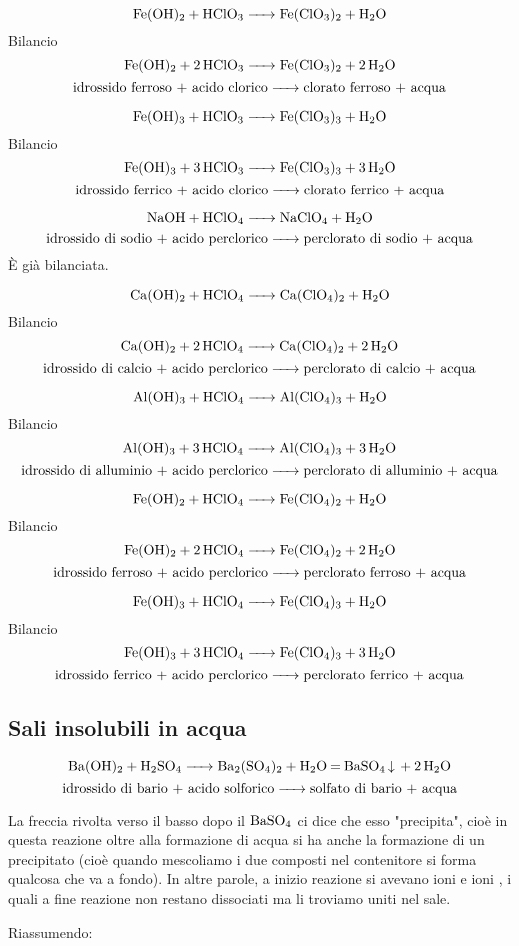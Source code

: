 $$\ce{Fe(OH)_2 + HClO_3 -> Fe(ClO_3)_2 + H_2O}$$Bilancio
$$\ce{Fe(OH)_2 + 2HClO_3 -> Fe(ClO_3)_2 + 2H_2O}$$
$$\text{idrossido ferroso + acido clorico}\ce{->}\text{clorato ferroso + acqua}$$

$$\ce{Fe(OH)_3 + HClO_3 -> Fe(ClO_3)_3 + H_2O}$$Bilancio
$$\ce{Fe(OH)_3 + 3 HClO_3 -> Fe(ClO_3)_3 + 3 H_2O}$$
$$\text{idrossido ferrico + acido clorico}\ce{->}\text{clorato ferrico + acqua}$$

$$\ce{NaOH + HClO_4 -> NaClO_4 + H_2O}$$
$$\text{idrossido di sodio + acido perclorico}\ce{->}\text{perclorato di sodio + acqua}$$
È già bilanciata.

$$\ce{Ca(OH)_2 + HClO_4 -> Ca(ClO_4)_2 + H_2O}$$Bilancio
$$\ce{Ca(OH)_2 + 2 HClO_4 -> Ca(ClO_4)_2 + 2 H_2O}$$
$$\text{idrossido di calcio + acido perclorico}\ce{->}\text{perclorato di calcio + acqua}$$

$$\ce{Al(OH)_3 + HClO_4 -> Al(ClO_4)_3 + H_2O}$$Bilancio
$$\ce{Al(OH)_3 + 3 HClO_4 -> Al(ClO_4)_3 + 3 H_2O}$$
$$\text{idrossido di alluminio + acido perclorico}\ce{->}\text{perclorato di alluminio + acqua}$$

$$\ce{Fe(OH)_2 + HClO_4 -> Fe(ClO_4)_2 + H_2O}$$Bilancio
$$\ce{Fe(OH)_2 + 2 HClO_4 -> Fe(ClO_4)_2 + 2 H_2O}$$
$$\text{idrossido ferroso + acido perclorico}\ce{->}\text{perclorato ferroso + acqua}$$

$$\ce{Fe(OH)_3 + HClO_4 -> Fe(ClO_4)_3 + H_2O}$$Bilancio
$$\ce{Fe(OH)_3 + 3 HClO_4 -> Fe(ClO_4)_3 + 3 H_2O}$$
$$\text{idrossido ferrico + acido perclorico}\ce{->}\text{perclorato ferrico + acqua}$$

\subsection{Sali insolubili in acqua}
$$\ce{Ba(OH)_2 + H_2SO_4 -> Ba_2(SO_4)_2 + H_2O = BaSO_4 v + 2H_2O}$$
$$\text{idrossido di bario + acido solforico}\ce{->}\text{solfato di bario + acqua}$$

La freccia rivolta verso il basso dopo il $\rm BaSO_4$ ci dice che esso "precipita", cioè in questa reazione oltre alla formazione di acqua si ha anche la formazione di un precipitato (cioè quando mescoliamo i due composti nel contenitore si forma qualcosa che va a fondo). In altre parole, a inizio reazione si avevano ioni  e ioni , i quali a fine reazione non restano dissociati ma li troviamo uniti nel sale.

\vspace{0.2cm}Riassumendo:

